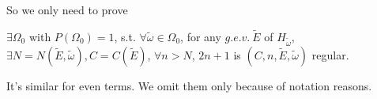 So we only need to prove
\begin{thm}\label{thm2}
  $\exists \Omega_0$ with $P(\Omega_0)=1$, s.t. $\forall \tilde{\omega}\in\Omega_0$, for any $g.e.v.~\tilde{E}$ of $H_{\tilde{\omega}}$, $\exists N=N(\tilde{E},\tilde{\omega}),C=C(\tilde{E})$, $\forall n>N$, $2n+1$ is $(C,n,\tilde{E},\tilde{\omega})$ regular.
\end{thm}
\begin{remark}
  It's similar for even terms. We omit them only because of notation reasons.
\end{remark}

